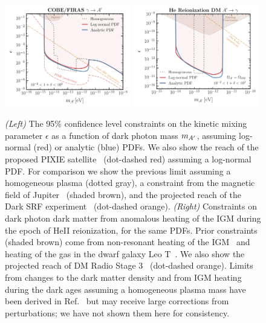 \documentclass[prd,aps,10pt,nofootinbib,twocolumn,superscriptaddress,preprintnumbers,balancelastpage,longbibliography]{revtex4-1}
\begin{document}
%
\begin{figure}[!htbp]
    \centering
    \includegraphics[width=0.49\textwidth]{plots/limit}
    \includegraphics[width=0.49\textwidth]{plots/limit_DP_DM.pdf}
    \caption{\emph{(Left)} The 95\% confidence level constraints on the kinetic mixing parameter $\epsilon$ as a function of dark photon mass $m_{A^\prime}$, assuming log-normal (red) or analytic (blue) PDFs.  We also show the reach of the proposed PIXIE satellite~\cite{Kogut:2011xw} (dot-dashed red) assuming a log-normal PDF\@.  For comparison we show the previous limit assuming a homogeneous plasma (dotted gray), a constraint from the magnetic field of Jupiter~\cite{Davis:1975mn,Ahlers:2008qc} (shaded brown), and the projected reach of the Dark SRF experiment~\cite{HarnikSRF,GrassellinoSRF} (dot-dashed orange). 
\emph{(Right)} Constraints on dark photon dark matter from anomalous heating of the IGM during the epoch of HeII reionization, for the same PDFs. Prior constraints (shaded brown) come from non-resonant heating of the IGM~\cite{McDermott:2019lch} and heating of the gas in the dwarf galaxy Leo T~\cite{Wadekar:2019xnf}.  We also show the projected reach of DM Radio Stage 3~\cite{Chaudhuri:2014dla,Silva-Feaver:2016qhh,Battaglieri:2017aum} (dot-dashed orange). Limits from changes to the dark matter density and from IGM heating during the dark ages assuming a homogeneous plasma mass have been derived in Ref.~\cite{McDermott:2019lch} but may receive large corrections from perturbations; we have not shown them here for consistency. } 
    \label{fig:limit}
\end{figure}
%
\end{document}
